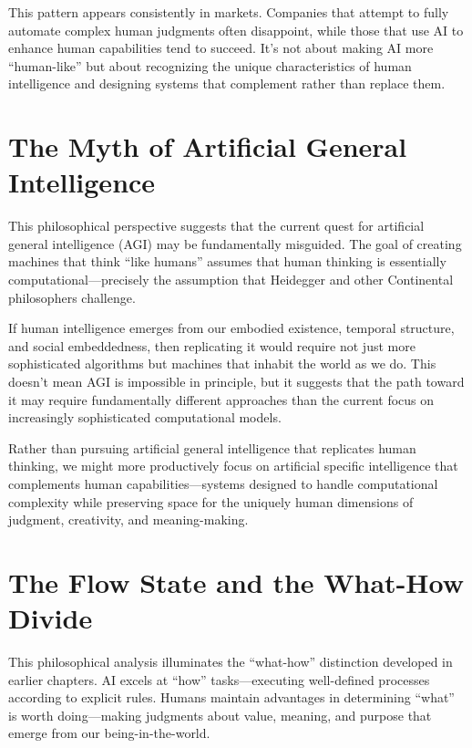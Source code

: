 \documentclass[
  Letterpaper,
]{scrbook}
\begin{document}
This pattern appears consistently in markets. Companies that attempt to
fully automate complex human judgments often disappoint, while those
that use AI to enhance human capabilities tend to succeed. It's not
about making AI more ``human-like'' but about recognizing the unique
characteristics of human intelligence and designing systems that
complement rather than replace them.

\section{The Myth of Artificial General
Intelligence}\label{the-myth-of-artificial-general-intelligence}

This philosophical perspective suggests that the current quest for
artificial general intelligence (AGI) may be fundamentally misguided.
The goal of creating machines that think ``like humans'' assumes that
human thinking is essentially computational---precisely the assumption
that Heidegger and other Continental philosophers challenge.

If human intelligence emerges from our embodied existence, temporal
structure, and social embeddedness, then replicating it would require
not just more sophisticated algorithms but machines that inhabit the
world as we do. This doesn't mean AGI is impossible in principle, but it
suggests that the path toward it may require fundamentally different
approaches than the current focus on increasingly sophisticated
computational models.

Rather than pursuing artificial general intelligence that replicates
human thinking, we might more productively focus on artificial specific
intelligence that complements human capabilities---systems designed to
handle computational complexity while preserving space for the uniquely
human dimensions of judgment, creativity, and meaning-making.

\section{The Flow State and the What-How
Divide}\label{the-flow-state-and-the-what-how-divide}

This philosophical analysis illuminates the ``what-how'' distinction
developed in earlier chapters. AI excels at ``how'' tasks---executing
well-defined processes according to explicit rules. Humans maintain
advantages in determining ``what'' is worth doing---making judgments
about value, meaning, and purpose that emerge from our
being-in-the-world.
\end{document}
